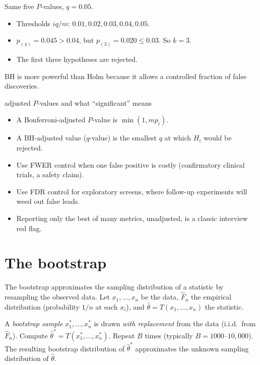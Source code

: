 \begin{example}
Same five $P$-values, $q=0.05$.
\begin{itemize}
  \item Thresholds $iq/m$: $0.01,0.02,0.03,0.04,0.05$.
  \item $p_{(4)}=0.045>0.04$, but $p_{(3)}=0.020\le0.03$. So $k=3$.
  \item The first three hypotheses are rejected.
\end{itemize}
BH is more powerful than Holm because it allows a controlled fraction of false discoveries.
\end{example}

\begin{interview}{adjusted $P$-values and what ``significant'' means}
\begin{itemize}
  \item A Bonferroni-adjusted $P$-value is $\min(1,mp_i)$.
  \item A BH-adjusted value ($q$-value) is the smallest $q$ at which $H_i$ would be rejected.
  \item Use FWER control when one false positive is costly (confirmatory clinical trials, a safety claim).
  \item Use FDR control for exploratory screens, where follow-up experiments will weed out false leads.
  \item Reporting only the best of many metrics, unadjusted, is a classic interview red flag.
\end{itemize}
\end{interview}

\section{The bootstrap}

The bootstrap approximates the sampling distribution of a statistic by resampling the observed data. Let $x_1,\dots,x_n$ be the data, $\hat F_n$ the empirical distribution (probability $1/n$ at each $x_i$), and $\hat\theta=T(x_1,\dots,x_n)$ the statistic.

\begin{definition}
A \emph{bootstrap sample} $x_1^*,\dots,x_n^*$ is drawn \emph{with replacement} from the data (i.i.d.\ from $\hat F_n$). Compute $\hat\theta^*=T(x_1^*,\dots,x_n^*)$. Repeat $B$ times (typically $B=1000$--$10{,}000$). The resulting bootstrap distribution of $\hat\theta^*$ approximates the unknown sampling distribution of $\hat\theta$.
\end{definition}

